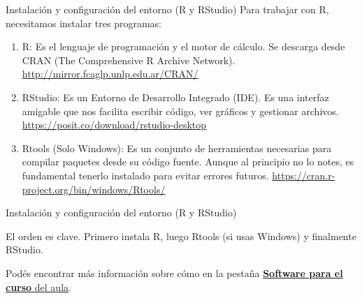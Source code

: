 \documentclass[8pt]{beamer}
\begin{document}
	\subtitle{1er encuentro: Instalaci\'on y primeros pasos}

	\begin{frame}[plain]
		\maketitle
	\end{frame}






	\begin{frame}{Instalación y configuración del entorno (R y RStudio)}
		Para trabajar con R, necesitamos instalar tres programas:
		\begin{enumerate}
			\item R: Es el lenguaje de programación y el motor de cálculo. Se descarga desde CRAN (The Comprehensive R Archive Network).
			\url{http://mirror.fcaglp.unlp.edu.ar/CRAN/}
			
			\item RStudio: Es un Entorno de Desarrollo Integrado (IDE). Es una interfaz amigable que nos facilita escribir código, ver gráficos y gestionar archivos.
			\url{https://posit.co/download/rstudio-desktop}
			
			\item Rtools (Solo Windows): Es un conjunto de herramientas necesarias para compilar paquetes desde su código fuente. Aunque al principio no lo notes, es fundamental tenerlo instalado para evitar errores futuros.
			\url{https://cran.r-project.org/bin/windows/Rtools/}
		\end{enumerate}
	\end{frame}








	\begin{frame}{Instalación y configuración del entorno (R y RStudio)}
		\begin{alertblock}{}
			El orden es clave. Primero instala R, luego Rtools (si usas Windows) y finalmente RStudio.
		\end{alertblock}
		
		
		Pod\'es encontrar m\'as informaci\'on sobre c\'omo en la pesta\~na \href{https://servicios.unl.edu.ar/aulavirtual/fce/course/view.php?id=575}{\textbf{Software para el curso} del aula}.
	\end{frame}



	
	
\end{document}
